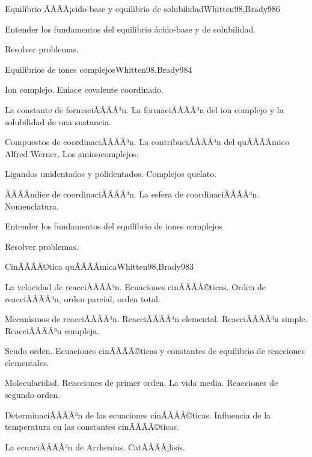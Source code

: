 \begin{sumilla}
\begin{unit}{Equilibrio ÃÂÃÂ¡cido-base y equilibrio de solubilidad}{Whitten98,Brady98}{6}
\begin{objetivos}
	\item Entender los fundamentos del equilibrio \'acido-base y de solubilidad.
	\item Resolver problemas.
\end{objetivos}
\end{unit}

\begin{unit}{Equilibrios de iones complejos}{Whitten98,Brady98}{4}
\begin{topicos}
	\item Ion complejo. Enlace covalente coordinado.
	\item La constante de formaciÃÂÃÂ³n. La formaciÃÂÃÂ³n del ion complejo y la solubilidad de una sustancia.
	\item Compuestos de coordinaciÃÂÃÂ³n. La contribuciÃÂÃÂ³n del quÃÂÃÂ­mico Alfred Werner. Los aminocomplejos.
	\item Ligandos unidentados y polidentados. Complejos quelato.
	\item ÃÂÃÂndice de coordinaciÃÂÃÂ³n. La esfera de coordinaciÃÂÃÂ³n. Nomenclatura.
   \end{topicos}

   \begin{objetivos}
      \item Entender los fundamentos del equilibrio de iones complejos
      \item Resolver problemas.
   \end{objetivos}
\end{unit}

\begin{unit}{CinÃÂÃÂ©tica quÃÂÃÂ­mica}{Whitten98,Brady98}{3}
\begin{topicos}
      \item La velocidad de  reacciÃÂÃÂ³n. Ecuaciones cinÃÂÃÂ©ticas. Orden de reacciÃÂÃÂ³n, orden parcial, orden total.
      \item Mecanismos de reacciÃÂÃÂ³n. ReacciÃÂÃÂ³n elemental. ReacciÃÂÃÂ³n simple. ReacciÃÂÃÂ³n compleja.
	\item Seudo orden. Ecuaciones cinÃÂÃÂ©ticas y constantes de equilibrio de reacciones elementales.
	\item Molecularidad. Reacciones de primer orden. La vida media. Reacciones de segundo orden.
	\item DeterminaciÃÂÃÂ³n de las ecuaciones cinÃÂÃÂ©ticas. Influencia de la temperatura en las constantes cinÃÂÃÂ©ticas.
	\item La ecuaciÃÂÃÂ³n de Arrhenius. CatÃÂÃÂ¡lisis.
  \end{topicos}


\end{unit}
\end{sumilla}
